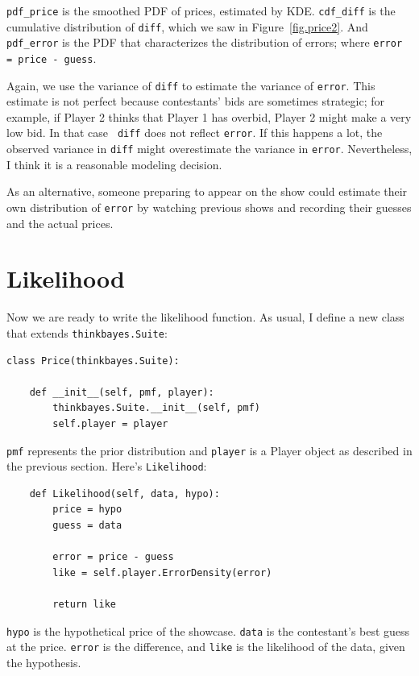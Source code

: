 \documentclass[12pt]{book}
\begin{document}
\verb"pdf_price" is the smoothed PDF of prices, estimated by KDE.
\verb"cdf_diff" is the cumulative distribution of {\tt diff},
which we saw in Figure~\ref{fig.price2}.  And \verb"pdf_error"
is the PDF that characterizes the distribution of errors; where
{\tt error = price - guess}.

Again, we use the variance of {\tt diff} to estimate the variance of
{\tt error}.  This estimate is not perfect because contestants' bids
are sometimes strategic; for example, if Player 2 thinks that Player 1
has overbid, Player 2 might make a very low bid.  In that case {\tt
  diff} does not reflect {\tt error}.  If this happens a lot, the
observed variance in {\tt diff} might overestimate the variance in
{\tt error}.  Nevertheless, I think it is a reasonable modeling
decision.

As an alternative, someone preparing to appear on the show could
estimate their own distribution of {\tt error} by watching previous shows
and recording their guesses and the actual prices.


\section{Likelihood}

Now we are ready to write the likelihood function.  As usual,
I define a new class that extends {\tt thinkbayes.Suite}:

\begin{verbatim}
class Price(thinkbayes.Suite):

    def __init__(self, pmf, player):
        thinkbayes.Suite.__init__(self, pmf)
        self.player = player
\end{verbatim}

{\tt pmf} represents the prior distribution and
{\tt player} is a Player object as described in the previous
section.  Here's {\tt Likelihood}:

\begin{verbatim}
    def Likelihood(self, data, hypo):
        price = hypo
        guess = data

        error = price - guess
        like = self.player.ErrorDensity(error)

        return like
\end{verbatim}

{\tt hypo} is the hypothetical price of the showcase.  {\tt data}
is the contestant's best guess at the price.  {\tt error} is
the difference, and {\tt like} is the likelihood of the data,
given the hypothesis.
\end{document}
